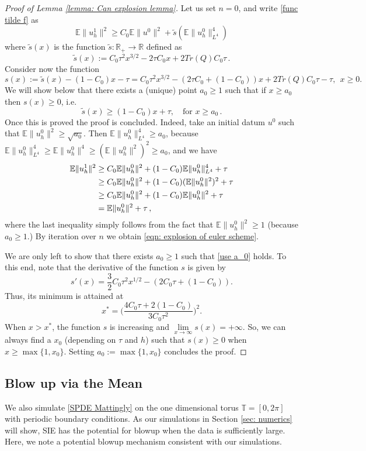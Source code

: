 \documentclass[reqno, 11pt]{amsart}
\theoremstyle{plain}
\theoremstyle{definition}
\theoremstyle{remark}
\numberwithin{equation}{section}
\numberwithin{theorem}{section}
\newcommand{\R}{\mathbb{R}}
\begin{document}
{\begin{proof}[Proof of Lemma \ref{lemma: Can explosion lemma}]
 Let us set  $n=0$, and write \eqref{func tilde f} as 
 $$
 \mathbb E \|u^1_h\|^2 \geq C_0 \mathbb E \|u^0\|^2 + \tilde s(\mathbb E \|u^0_h\|_{L^4}^4)
 $$
 where 
 $\tilde s (x)$ is the function $\tilde s:\R_+ \rightarrow \R$ defined as 
 $$
 \tilde s(x) := C_0\tau^2 x^{3/2}-2\tau C_0 x+ 2Tr(Q) C_0\tau \,.
 $$
 Consider now the function
 $$
 s(x):= \tilde s(x) - (1-C_0) x-\tau = C_0\tau^2 x^{3/2}-(2\tau C_0+(1-C_0))x+2Tr(Q)C_0\tau-\tau, \ \ x\geq 0.
 $$
 We will show below that there exists a (unique) point $a_0\geq 1$ such that if $x\geq a_0 $ then $s(x)\geq 0$, i.e.
 \begin{equation}\label{use a_0}
     \tilde s(x) \geq (1-C_0) x +\tau, \quad \mbox{for } x\geq a_0 \,.
 \end{equation}
Once this is proved the proof is concluded. Indeed, take an initial datum $u^0$ such that $\mathbb{E}\|u_h^0\|^2\geq \sqrt{a_0}$.  Then  
$\mathbb{E}\|u_h^0\|_{L^4}^4\geq a_0$, because 
  $\mathbb{E}\|u_h^0\|_{L^4}^4\geq \mathbb{E}\|u_h^0\|^4\geq (\mathbb{E}\|u_h^0\|^2)^2\geq a_0$, and 
  we have
 \begin{align}
 \mathbb{E}\|u_h^1\|^2&\geq C_0\mathbb{E}\|u_h^0\|^2+(1-C_0)\mathbb{E}\|u_h^0\|_{L^4}^4+\tau\notag\\
 &\geq C_0\mathbb{E}\|u_h^0\|^2+(1-C_0)(\mathbb{E}\|u_h^0\|^2)^2+\tau\notag\\
 &\geq C_0\mathbb{E}\|u_h^0\|^2+(1-C_0)\mathbb{E}\|u_h^0\|^2+\tau\notag\\
 & = \mathbb{E}\|u_h^0\|^2+\tau \, ,
 \end{align}
 where the last inequality simply follows from the fact that $\mathbb{E}\|u_h^0\|^2 \geq 1$ (because $a_0\geq 1$.)
 By iteration over $n$ we obtain \eqref{eqn: explosion of euler scheme}. 

We are only left to show that there exists $a_0\geq 1$ such that \eqref{use a_0} holds. To this end, note that the derivative of the function $s$ is given by 
 $$
 s'(x)=\frac{3}{2}C_0\tau^2 x^{1/2}-(2C_0\tau+(1-C_0)).
 $$
 Thus, its minimum is attained at
 $$
 x^*=\bigg(\frac{4C_0\tau+2(1-C_0)}{3C_0\tau^2}\bigg)^2.
 $$
 When $x>x^*$, the function $s$ is increasing and $\lim\limits_{x\to\infty}s(x)=+\infty$. So, we can always find a $x_0$ (depending on $\tau$ and $h$) such that $s(x) \geq 0$
 when $x\geq \max\{1,x_0\}$. Setting $a_0:= \max\{1,x_0\}$ concludes the proof.  
  
 \end{proof}




\subsection{Blow up via the Mean} 
\label{s:periodicblowup}
We also simulate \eqref{SPDE Mattingly} on the one dimensional  torus $\mathbb T = [0,2\pi]$ with periodic boundary conditions.  As our simulations  in Section \ref{sec: numerics} will show, SIE has the potential for blowup when the data is sufficiently large.  Here, we note a potential blowup mechanism consistent with our simulations.

}
\end{document}
